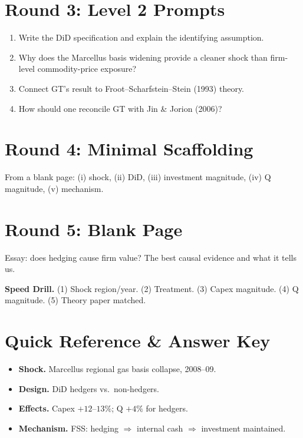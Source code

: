 \documentclass[11pt]{article}
\begin{document}
\section*{Round 3: Level 2 Prompts}
\begin{enumerate}
\item Write the DiD specification and explain the identifying assumption.
\item Why does the Marcellus basis widening provide a cleaner shock than firm-level commodity-price exposure?
\item Connect GT's result to Froot--Scharfstein--Stein (1993) theory.
\item How should one reconcile GT with Jin \& Jorion (2006)?
\end{enumerate}

\section*{Round 4: Minimal Scaffolding}
From a blank page: (i) shock, (ii) DiD, (iii) investment magnitude, (iv) Q magnitude, (v) mechanism.

\section*{Round 5: Blank Page}
Essay: does hedging cause firm value? The best causal evidence and what it tells us.

\vspace{6pt}
\begin{drillbox}
\textbf{Speed Drill.} (1) Shock region/year. (2) Treatment. (3) Capex magnitude. (4) Q magnitude. (5) Theory paper matched.
\end{drillbox}

\section*{Quick Reference \& Answer Key}
\begin{answerbox}
\begin{itemize}
\item \textbf{Shock.} Marcellus regional gas basis collapse, 2008--09.
\item \textbf{Design.} DiD hedgers vs.\ non-hedgers.
\item \textbf{Effects.} Capex $+12$--$13\%$; Q $+4\%$ for hedgers.
\item \textbf{Mechanism.} FSS: hedging $\Rightarrow$ internal cash $\Rightarrow$ investment maintained.
\end{itemize}
\end{answerbox}
\end{document}
